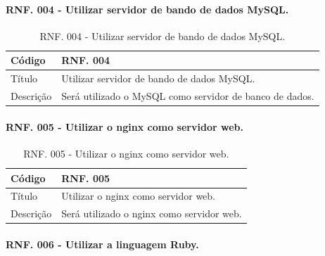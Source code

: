 \documentclass[11pt]{article}
\begin{document}
      \paragraph{RNF. 004 - Utilizar servidor de bando de dados MySQL.} \hspace{10pt}

      \begin{table}[h]
        \begin{center}
          \begin{tabular}{ | p{5cm} | p{10cm} | }
            \hline
            Código\cellcolor{gray} & RNF. 004\cellcolor{gray} \\
            \hline
            Título & Utilizar servidor de bando de dados MySQL. \\
            \hline
            Descrição & Será utilizado o MySQL como servidor de banco de dados. \\
            \hline
          \end{tabular}
          \caption{RNF. 004 - Utilizar servidor de bando de dados MySQL.}
        \end{center}
      \end{table}

      \paragraph{RNF. 005 - Utilizar o nginx como servidor web.} \hspace{10pt}

      \begin{table}[h]
        \begin{center}
          \begin{tabular}{ | p{5cm} | p{10cm} | }
            \hline
            Código\cellcolor{gray} & RNF. 005\cellcolor{gray} \\
            \hline
            Título & Utilizar o nginx como servidor web. \\
            \hline
            Descrição & Será utilizado o nginx como servidor web. \\
            \hline
          \end{tabular}
          \caption{RNF. 005 - Utilizar o nginx como servidor web.}
        \end{center}
      \end{table}

  \newpage

      \paragraph{RNF. 006 - Utilizar a linguagem Ruby.} \hspace{10pt}
\end{document}
